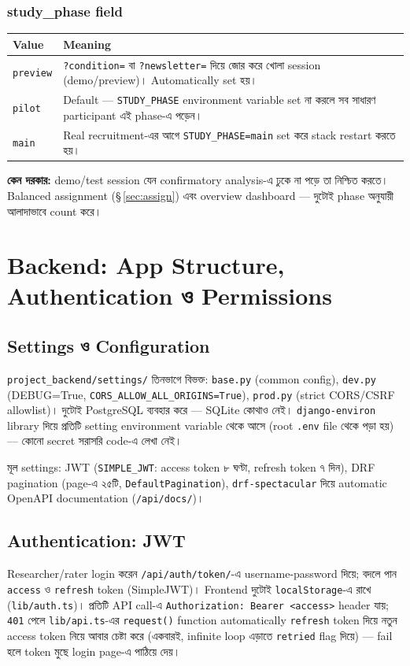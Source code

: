 \documentclass[11pt,a4paper]{article}
\newcommand{\code}[1]{\texttt{\small #1}}
\newcommand{\file}[1]{\texttt{\small #1}}
\begin{document}
\subsubsection{study\_phase field}
\label{sec:phase}
\begin{longtable}{@{}p{2.6cm}p{12.8cm}@{}}
\toprule
\textbf{Value} & \textbf{Meaning} \\
\midrule
\endhead
\code{preview} & \code{?condition=} বা \code{?newsletter=} দিয়ে জোর করে খোলা session
  (demo/preview)। Automatically set হয়। \\
\code{pilot} & Default --- \code{STUDY\_PHASE} environment variable set না করলে সব সাধারণ
  participant এই phase-এ পড়েন। \\
\code{main} & Real recruitment-এর আগে \code{STUDY\_PHASE=main} set করে stack restart করতে
  হয়। \\
\bottomrule
\end{longtable}
\textbf{কেন দরকার:} demo/test session যেন confirmatory analysis-এ ঢুকে না পড়ে তা নিশ্চিত
করতে। Balanced assignment (\S\,\ref{sec:assign}) এবং overview dashboard --- দুটোই phase
অনুযায়ী আলাদাভাবে count করে।

\newpage
\section{Backend: App Structure, Authentication ও Permissions}

\subsection{Settings ও Configuration}
\code{project\_backend/settings/} তিনভাগে বিভক্ত: \code{base.py} (common config),
\code{dev.py} (DEBUG=True, \code{CORS\_ALLOW\_ALL\_ORIGINS=True}), \code{prod.py} (strict
CORS/CSRF allowlist)। দুটোই PostgreSQL ব্যবহার করে --- SQLite কোথাও নেই।
\code{django-environ} library দিয়ে প্রতিটি setting environment variable থেকে আসে (root
\file{.env} file থেকে পড়া হয়) --- কোনো secret সরাসরি code-এ লেখা নেই।

মূল settings: JWT (\code{SIMPLE\_JWT}: access token ৮ ঘণ্টা, refresh token ৭ দিন), DRF
pagination (page-এ ২৫টি, \code{DefaultPagination}), \code{drf-spectacular} দিয়ে automatic
OpenAPI documentation (\code{/api/docs/})।

\subsection{Authentication: JWT}
Researcher/rater login করেন \code{/api/auth/token/}-এ username-password দিয়ে; বদলে পান
\code{access} ও \code{refresh} token (SimpleJWT)। Frontend দুটোই \code{localStorage}-এ রাখে
(\file{lib/auth.ts})। প্রতিটি API call-এ \code{Authorization: Bearer <access>} header যায়;
\code{401} পেলে \file{lib/api.ts}-এর \code{request()} function automatically \code{refresh}
token দিয়ে নতুন access token নিয়ে আবার চেষ্টা করে (একবারই, infinite loop এড়াতে
\code{retried} flag দিয়ে) --- fail হলে token মুছে login page-এ পাঠিয়ে দেয়।
\end{document}
